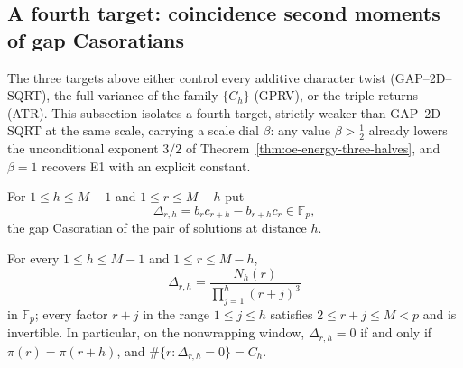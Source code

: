 
\subsection{A fourth target: coincidence second moments of gap Casoratians}
\label{subsec:coinc-target}

The three targets above either control every additive character twist
(GAP--2D--SQRT), the full variance of the family $\{C_h\}$ (GPRV), or the
triple returns (ATR).  This subsection isolates a fourth target, strictly
weaker than GAP--2D--SQRT at the same scale, carrying a scale dial
$\beta$: any value $\beta>\tfrac12$ already lowers the unconditional
exponent $3/2$ of Theorem~\ref{thm:oe-energy-three-halves}, and $\beta=1$
recovers E1 with an explicit constant.

For $1\le h\le M-1$ and $1\le r\le M-h$ put
\[
 \Delta_{r,h}=b_rc_{r+h}-b_{r+h}c_r\in\mathbb F_p ,
\]
the gap Casoratian of the pair of solutions at distance $h$.

\begin{lemma}\label{lem:coinc-gap-identity}
For every $1\le h\le M-1$ and $1\le r\le M-h$,
\begin{equation}\label{eq:coinc-gap-identity}
 \boxed{\;\Delta_{r,h}
 =\frac{N_h(r)}{\prod_{j=1}^{h}(r+j)^3}\;}
\end{equation}
in $\mathbb F_p$; every factor $r+j$ in the range $1\le j\le h$ satisfies
$2\le r+j\le M<p$ and is invertible.  In particular, on the nonwrapping
window, $\Delta_{r,h}=0$ if and only if $\pi(r)=\pi(r+h)$, and
$\#\{r:\Delta_{r,h}=0\}=C_h$.
\end{lemma}

